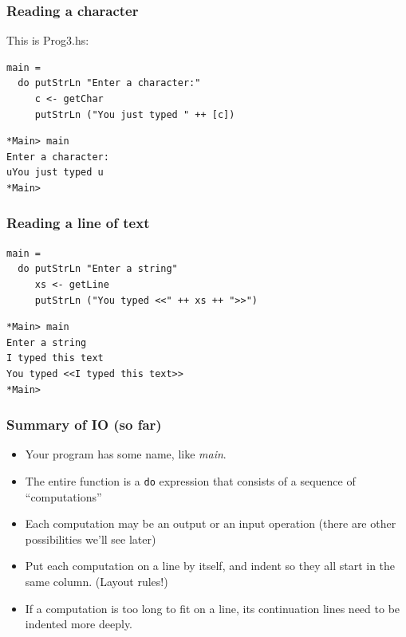 \documentclass{beamer}
\begin{document}
\begin{frame}[fragile]
\frametitle{Reading a character}

This is Prog3.hs:

\begin{verbatim}
main =
  do putStrLn "Enter a character:"
     c <- getChar
     putStrLn ("You just typed " ++ [c])
\end{verbatim}

\begin{verbatim}
*Main> main
Enter a character:
uYou just typed u
*Main> 
\end{verbatim}

\end{frame}


\begin{frame}[fragile]
\frametitle{Reading a line of text}

\begin{verbatim}
main =
  do putStrLn "Enter a string"
     xs <- getLine
     putStrLn ("You typed <<" ++ xs ++ ">>")
\end{verbatim}

\begin{verbatim}
*Main> main
Enter a string
I typed this text
You typed <<I typed this text>>
*Main> 
\end{verbatim}


\end{frame}

\begin{frame}[fragile]
\frametitle{Summary of IO (so far)}

\begin{itemize}
\item Your program has some name, like \emph{main}.
\item The entire function is a \texttt{do} expression that consists of a
  sequence of ``computations''
\item Each computation may be an output or an input operation
  (there are other possibilities we'll see later)
\item Put each computation on a line by itself, and indent so they
  all start in the same column. (Layout rules!)
\item If a computation is too long to fit on a line, its
  continuation lines need to be indented more deeply.
\end{itemize}

\end{frame}
\end{document}
